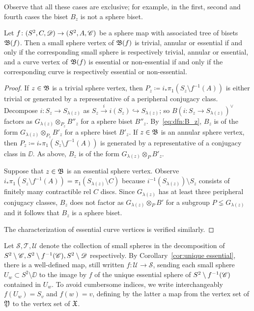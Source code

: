 \documentclass{amsart}
\begin{document}
\noindent Observe that all these cases are exclusive; for example, in
the first, second and fourth cases the biset $B_z$ is not a sphere
biset.

\begin{lem}\label{lem:AlgClassOfBis}
  Let $f\colon(S^2,C,{\mathscr D})\to(S^2,A,{\mathscr C})$ be a sphere map with
  associated tree of bisets ${\mathfrak B}(f)$. Then a small sphere
  vertex of ${\mathfrak B}(f)$ is trivial, annular or essential if and
  only if the corresponding small sphere is respectively trivial,
  annular or essential, and a curve vertex of ${\mathfrak B}(f)$ is
  essential or non-essential if and only if the corresponding curve is
  respectively essential or non-essential.
\end{lem}
\begin{proof}
  If $z\in {\mathfrak B}$ is a trivial sphere vertex, then
  $P_z\coloneqq i_* \pi_1(S_z\setminus f^{-1}(A))$ is either trivial
  or generated by a representative of a peripheral conjugacy
  class. Decompose $i\colon S_z\to S_{\lambda(z)}$ as
  $S_z \overset{i}{\rightarrow} i(S_z)\hookrightarrow S_{\lambda(z)}$;
  so $B(i\colon S_z\to S_{\lambda(z)})^\vee$ factors as
  $G_{\lambda(z)}\otimes_{P_z} B''_z$ for a sphere biset
  $B''_z$. By~\eqref{eq:dfn:B_z}, $B_z$ is of the form
  $G_{\lambda(z)}\otimes_{P_z} B'_z$ for a sphere biset $B'_z$. If
  $z\in {\mathfrak B}$ is an annular sphere vertex, then
  $P_z\coloneqq i_*\pi_1(S_z\setminus f^{-1}(A))$ is generated by a
  representative of a conjugacy class in $\DD$. As above, $B_z$ is of
  the form $G_{\lambda(z)}\otimes_P B'_z$.

  Suppose that $z\in {\mathfrak B}$ is an essential sphere
  vertex. Observe
  $i_*\pi_1(S_z\setminus f^{-1}(A))= \pi_1(S_{\lambda(z)}\setminus C)$
  because $i^{-1}(S_{\lambda(z)})\setminus S_z$ consists of finitely
  many contractible rel $C$ discs. Since $G_{\lambda(z)}$ has at least
  three peripheral conjugacy classes, $B_z$ does not factor as
  $G_{\lambda(z)}\otimes_P B'$ for a subgroup $P\lneq G_{\lambda(z)}$
  and it follows that $B_z$ is a sphere biset.
  
  The characterization of essential curve vertices is verified
  similarly.
\end{proof}

Let $\mathscr S,\mathscr T,\mathscr U$ denote the collection of small
spheres in the decomposition of
$S^2\setminus{\mathscr C},S^2\setminus f^{-1}({\mathscr C}),S^2\setminus{\mathscr D}$
respectively. By Corollary~\ref{cor:unique essential}, there is a
well-defined map, still written $f\colon\mathscr U\to\mathscr S$,
sending each small sphere $U_w\subset S^2\setminus\DD$ to the image by
$f$ of the unique essential sphere of $S^2\setminus f^{-1}({\mathscr C})$
contained in $U_w$. To avoid cumbersome indices, we write
interchangeably $f(U_w)=S_v$ and $f(w)=v$, defining by the latter a
map from the vertex set of ${\mathfrak Y}$ to the vertex set of ${\mathfrak X}$.
\end{document}
